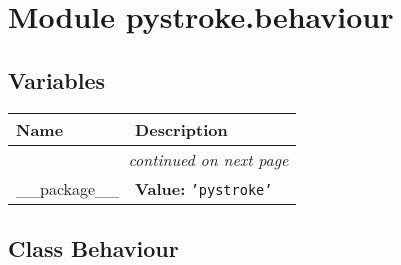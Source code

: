 %
%
%


\section{Module pystroke.behaviour}

    \label{pystroke:behaviour}


  \subsection{Variables}

    \vspace{-1cm}
\hspace{\varindent}\begin{longtable}{|p{\varnamewidth}|p{\vardescrwidth}|l}
\cline{1-2}
\cline{1-2} \centering \textbf{Name} & \centering \textbf{Description}& \\
\cline{1-2}
\endhead\cline{1-2}\multicolumn{3}{r}{\small\textit{continued on next page}}\\\endfoot\cline{1-2}
\endlastfoot\raggedright \_\-\_\-p\-a\-c\-k\-a\-g\-e\-\_\-\_\- & \raggedright \textbf{Value:} 
{\tt \texttt{'}\texttt{pystroke}\texttt{'}}&\\
\cline{1-2}
\end{longtable}



\subsection{Class Behaviour}

